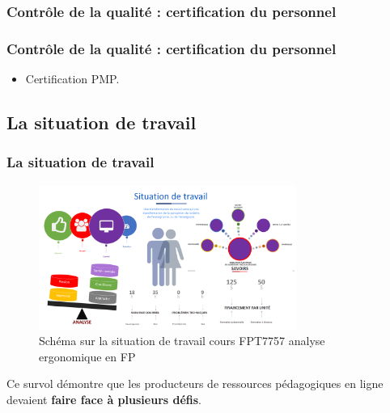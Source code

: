 					\subsubsection{Contrôle de la qualité : certification du personnel} 
							\begin{frame}[allowframebreaks]
							\frametitle{Contrôle de la qualité : certification du personnel}
                        			
							\begin{itemize}
							\item Certification PMP.
							\end{itemize}						
					\end{frame}	
								
				\subsection{La situation de travail} 
						\begin{frame}[allowframebreaks]
						\frametitle{La situation de travail}
                        			\begin{figure}
                     			\centering
                    			 \includegraphics[width = 0.75\textwidth]{situation.png}
                     			\caption{\tiny{Schéma sur la situation de travail cours FPT7757 analyse ergonomique en FP}}
                   			\end{figure}
                        			Ce survol démontre que les producteurs de ressources pédagogiques en ligne devaient \textbf{faire face à plusieurs défis}. 
						
						\end{frame}	
													
